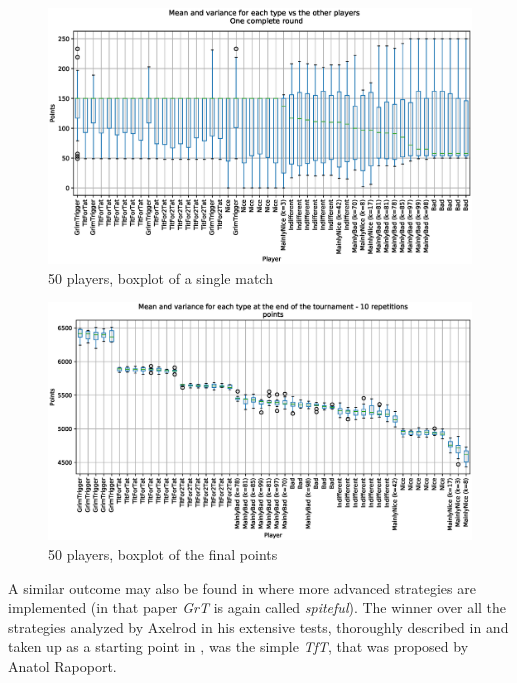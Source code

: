 \documentclass[journal,10pt,twoside]{IEEEtran}
\begin{document}
\begin{figure}[!ht]
    \centering
    \includegraphics[width=1\columnwidth]{../img/ipdmp/ipdmp-boxplot-single-match-50}
    \caption{50 players, boxplot of a single match}
    \label{fig:ipdmp50boxsingle}
\end{figure}

\begin{figure}[!ht]
    \centering
    \includegraphics[width=1\columnwidth]{../img/ipdmp/ipdmp-boxplot-final-points-50}
    \caption{50 players, boxplot of the final points}
    \label{fig:ipdmp50boxfinal}
\end{figure}

A similar outcome may also be found in \cite{mathieu2017} where more advanced strategies are implemented (in that paper \textit{GrT} is again called \textit{spiteful}).
The winner over all the strategies analyzed by Axelrod in his extensive tests, thoroughly described in \cite{axelrod1981evolution,axelrod1984evolution} and taken up as a starting point in \cite{mathieu2017}, was the simple \textit{TfT}, that was proposed by Anatol Rapoport.
\end{document}
